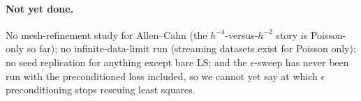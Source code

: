 \documentclass[11pt]{article}
\begin{document}
\paragraph{Not yet done.} No mesh-refinement study for Allen--Cahn (the $h^{-4}$-versus-$h^{-2}$
story is Poisson-only so far); no infinite-data-limit run (streaming datasets exist for Poisson
only); no seed replication for anything except bare LS; and the $\epsilon$-sweep has never been run
with the preconditioned loss included, so we cannot yet say at which $\epsilon$ preconditioning
stops rescuing least squares.
\end{document}
